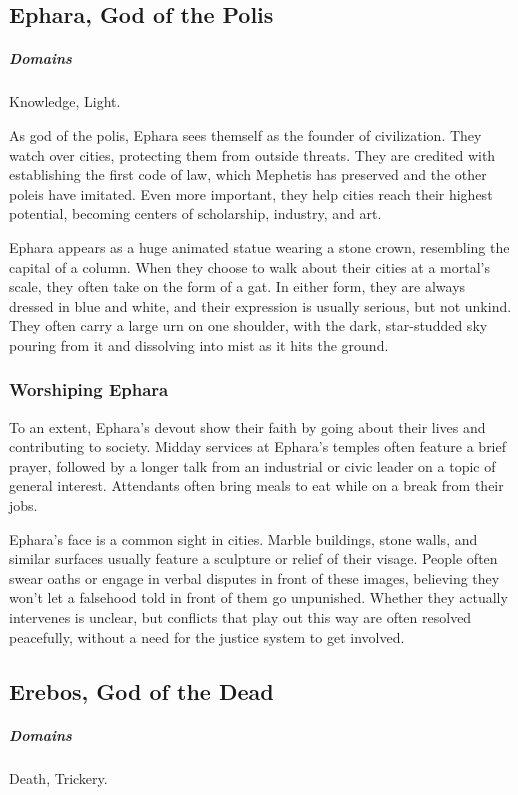 \subsection*{Ephara, God of the Polis} \label{ssec::ephara}
    \subparagraph{Domains} Knowledge, Light.

    As god of the polis, Ephara sees themself as the founder of civilization.
    They watch over cities, protecting them from outside threats.
    They are credited with establishing the first code of law, which Mephetis has preserved and the other poleis have imitated.
    Even more important, they help cities reach their highest potential, becoming centers of scholarship, industry, and art.

    Ephara appears as a huge animated statue wearing a stone crown, resembling the capital of a column.
    When they choose to walk about their cities at a mortal's scale, they often take on the form of a gat.
    In either form, they are always dressed in blue and white, and their expression is usually serious, but not unkind.
    They often carry a large urn on one shoulder, with the dark, star-studded sky pouring from it and dissolving into mist as it hits the ground.

    \subsubsection{Worshiping Ephara}
        To an extent, Ephara's devout show their faith by going about their lives and contributing to society.
        Midday services at Ephara's temples often feature a brief prayer, followed by a longer talk from an industrial or civic leader on a topic of general interest.
        Attendants often bring meals to eat while on a break from their jobs.

        Ephara's face is a common sight in cities.
        Marble buildings, stone walls, and similar surfaces usually feature a sculpture or relief of their visage.
        People often swear oaths or engage in verbal disputes in front of these images, believing they won't let a falsehood told in front of them go unpunished.
        Whether they actually intervenes is unclear, but conflicts that play out this way are often resolved peacefully, without a need for the justice system to get involved.

\subsection*{Erebos, God of the Dead} \label{ssec::erebos}
    \subparagraph{Domains} Death, Trickery.

